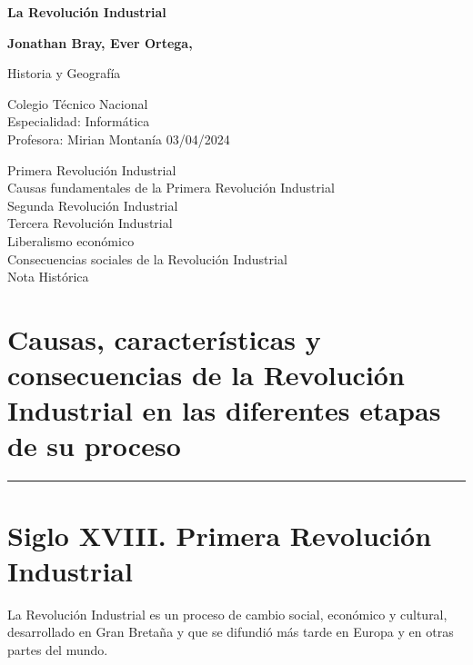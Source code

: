 \documentclass{article}
\begin{document}
\begin{titlepage}
  \begin{center}
      \vspace*{1cm}

      \Huge
      \textbf{La Revolución Industrial}

      \vspace{0.5cm}
      \LARGE
      \vspace{1.5cm}

      \textbf{Jonathan Bray, Ever Ortega, }

      \vfill

      Historia y Geografía

      \vspace{0.8cm}


      \Large
      Colegio Técnico Nacional\\
      Especialidad: Informática\\
      Profesora: Mirian Montanía
      03/04/2024

  \end{center}
\end{titlepage}

  \Large
  \noindent Primera Revolución Industrial \\
  Causas fundamentales de la Primera Revolución Industrial \\
  Segunda Revolución Industrial \\
  Tercera Revolución Industrial \\
  Liberalismo económico \\
  Consecuencias sociales de la Revolución Industrial \\
  Nota Histórica

  \normalsize
  \pagebreak
  \section*{\large Causas, características y consecuencias de la Revolución Industrial en las diferentes etapas de su proceso}
  \hrule
  \vspace{0.5cm}
  \section*{Siglo XVIII. Primera Revolución Industrial}
  
  La Revolución Industrial es un proceso de cambio social, económico y cultural, desarrollado en Gran Bretaña y que se difundió más tarde en Europa y en otras partes del mundo.
\end{document}
